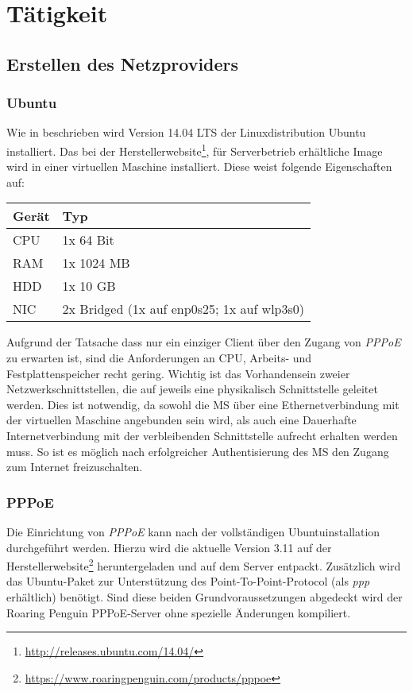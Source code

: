 \section{Tätigkeit}

\subsection{Erstellen des Netzproviders}

	\subsubsection{Ubuntu}
	Wie in  beschrieben wird Version 14.04 LTS
	der Linuxdistribution Ubuntu installiert. Das bei der Herstellerwebsite\footnote{\url{http://releases.ubuntu.com/14.04/}},
	für Serverbetrieb erhältliche Image wird in einer virtuellen Maschine installiert.
	Diese weist folgende Eigenschaften auf:

	\begin{tabularx}{\textwidth}{|l|X|}
    	\hline
      		\textbf{Gerät} & \textbf{Typ} \\
    	\hline
    	\hline
    		CPU & 1x 64 Bit \\
    	\hline
    	\hline
    		RAM & 1x 1024 MB \\
    	\hline
    	\hline
    		HDD & 1x 10 GB \\
    	\hline
    	\hline
    		NIC & 2x Bridged (1x auf enp0s25; 1x auf wlp3s0) \\
    	\hline
    	\end{tabularx}

    	Aufgrund der Tatsache dass nur ein einziger Client über den Zugang von \textit{PPPoE}
    	zu erwarten ist, sind die Anforderungen an CPU, Arbeits- und Festplattenspeicher
    	recht gering. Wichtig ist das Vorhandensein zweier Netzwerkschnittstellen, die
    	auf jeweils eine physikalisch Schnittstelle geleitet werden. Dies ist notwendig,
    	da sowohl die \ac{MS} über eine Ethernetverbindung mit der virtuellen Maschine angebunden sein wird,
    	als auch eine Dauerhafte Internetverbindung mit der verbleibenden Schnittstelle
    	aufrecht erhalten werden muss. So ist es möglich nach erfolgreicher Authentisierung
    	des \ac{MS} den Zugang zum Internet freizuschalten.

    	\subsubsection{PPPoE}
    	Die Einrichtung von \textit{PPPoE} kann nach der vollständigen Ubuntuinstallation durchgeführt werden. Hierzu wird die aktuelle
    	Version 3.11 auf der Herstellerwebsite\footnote{\url{https://www.roaringpenguin.com/products/pppoe}}
    	heruntergeladen und auf dem Server entpackt. Zusätzlich wird das Ubuntu-Paket zur Unterstützung
    	des Point-To-Point-Protocol (als \textit{ppp} erhältlich) benötigt. Sind diese beiden Grundvoraussetzungen
    	abgedeckt wird der Roaring Penguin PPPoE-Server ohne spezielle Änderungen kompiliert.

